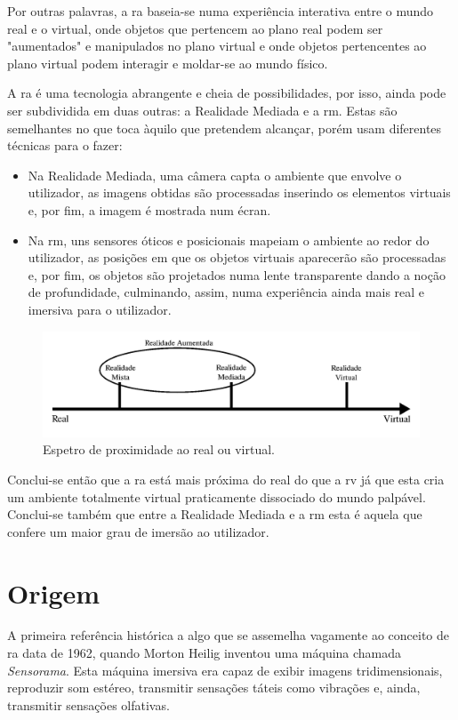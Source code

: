 \documentclass{report}
\begin{document}
Por outras palavras, a \ac{ra} baseia-se numa experiência interativa entre o mundo real e o virtual, onde objetos que pertencem ao plano real podem ser "aumentados" e manipulados no plano virtual e onde objetos pertencentes ao plano virtual podem interagir e moldar-se ao mundo físico.

A \ac{ra} é uma tecnologia abrangente e cheia de possibilidades, por isso, ainda pode ser subdividida em duas outras: a Realidade Mediada e a \ac{rm}. Estas são semelhantes no que toca àquilo que pretendem alcançar, porém usam diferentes técnicas para o fazer:
\begin{itemize}
    \item Na Realidade Mediada, uma câmera capta o ambiente que envolve o utilizador, as imagens obtidas são processadas inserindo os elementos virtuais e, por fim, a imagem é mostrada num écran.
    \item Na \ac{rm}, uns sensores óticos e posicionais mapeiam o ambiente ao redor do utilizador, as posições em que os objetos virtuais aparecerão são processadas e, por fim, os objetos são projetados numa lente transparente dando a noção de profundidade, culminando, assim, numa experiência ainda mais real e imersiva para o utilizador.
\end{itemize}

\begin{figure}[H]
    \centering
    \includegraphics[width=\textwidth]{spectre.png}
    \caption{Espetro de proximidade ao real ou virtual.}
    \label{Fig:spectre}
\end{figure}

Conclui-se então que a \ac{ra} está mais próxima do real do que a \ac{rv} já que esta cria um ambiente totalmente virtual praticamente dissociado do mundo palpável. Conclui-se também que entre a Realidade Mediada e a \ac{rm} esta é aquela que confere um maior grau de imersão ao utilizador.

\section{Origem}
A primeira referência histórica a algo que se assemelha vagamente ao conceito de \ac{ra} data de 1962, quando Morton Heilig inventou uma máquina chamada \textit{Sensorama}. Esta máquina imersiva era capaz de exibir imagens tridimensionais, reproduzir som estéreo, transmitir sensações táteis como vibrações e, ainda, transmitir sensações olfativas.\cite{sousa_ccg_2018}
\end{document}
